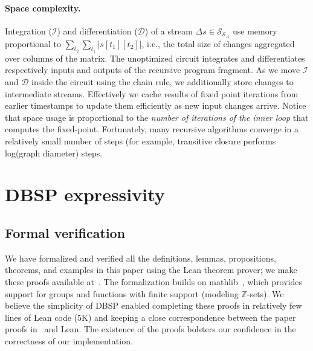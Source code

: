 \documentclass[twocolumn
]{svjour3}
\numberwithin{equation}{section}
\newcommand{\dbsp}{DBSP\xspace}
\newcommand{\zrs}{$\Z$-sets\xspace} %
\newcommand{\Z}{\mathbb{Z}}  %
\newcommand{\stream}[1]{\ensuremath{\mathcal{S}_{#1}}}
\newcommand{\I}{\mathcal{I}}  %
\newcommand{\D}{\mathcal{D}}  %
\newcommand{\I}{\mathit{I}}  %
\newcommand{\D}{\mathit{D}}  %
\begin{document}

\paragraph{Space complexity.} Integration ($\I$) and differentiation ($\D$) of a
stream $\Delta s \in \stream{\stream{A}}$ use memory proportional to
$\sum_{t_2}\sum_{t_1}|s[t_1][t_2]|$, i.e., the total size of changes
aggregated over columns of the matrix.  The unoptimized circuit integrates
and differentiates respectively inputs and outputs of the recursive program
fragment.  As we move $\I$ and $\D$ inside the circuit using the chain rule, we
additionally store changes to intermediate streams.  Effectively we cache results of
fixed point iterations from earlier timestamps to update them efficiently as new input changes arrive.
Notice that space usage is proportional to the \emph{number of iterations of the inner loop}
that computes the fixed-point.
Fortunately, many recursive algorithms converge in a relatively small number of steps
(for example, transitive closure performs log(graph diameter) steps.

%
\section{\dbsp expressivity}\label{sec:expressivity}

\subsection{Formal verification}

We have formalized and verified all the definitions, lemmas,
propositions, theorems, and examples in this paper using the Lean
theorem prover; we make these proofs available at~\cite{dbsp-theory}.
The formalization builds on mathlib~\cite{mathlib2020}, which provides
support for groups and functions with finite support (modeling
\zrs). We believe the simplicity of \dbsp enabled completing these
proofs in relatively few lines of Lean code (5K) and keeping a close
correspondence between the paper proofs in~\cite{tr} and Lean.  The
existence of the proofs bolsters our confidence in the correctness of
our implementation.
\end{document}

